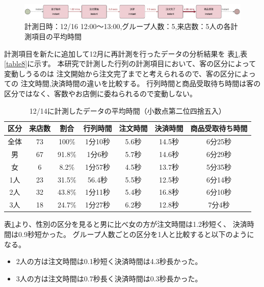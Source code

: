 \documentclass{jsarticle}
\begin{document}
\begin{figure}[H]
  \centering
  \includegraphics[width=15cm]{5-5b.png}
  \caption{計測日時：12/16 12:00〜13:00,グループ人数：5,来店数：5人の各計測項目の平均時間}
  \label{fig:5-5b}
\end{figure}





計測項目を新たに追加して12月に再計測を行ったデータの分析結果を
表\ref{table7},表\ref{table8}に示す。
本研究で計測した行列の計測項目において、客の区分によって変動しうるのは
注文開始から注文完了までと考えられるので、客の区分によっての
注文時間,決済時間の違いを比較する。
行列時間と商品受取待ち時間は客の区分ではなく、客数やお店側に委ねられるので変動しない。

\begin{table}[H]
 \begin{center}
  \caption{12/14に計測したデータの平均時間（小数点第二位四捨五入）}
    \begin{tabular}{|c|c|c|c|c|c|c|} \hline
区分 & 来店数 & 割合 & 行列時間 & 注文時間 & 決済時間 & 商品受取待ち時間 \\ \hline\hline
全体  & 73 & 100\%  & 1分10秒 & 5.6秒 & 14.5秒 & 6分25秒 \\ \hline \hline
男    & 67 & 91.8\% & 1分6秒  & 5.7秒 & 14.6秒 & 6分29秒 \\ \hline
女    & 6  & 8.2\%  & 1分57秒 & 4.5秒 & 13.7秒 & 5分35秒  \\ \hline \hline
1人   & 23 & 31.5\% & 56.4秒  & 5.5秒 & 12.5秒 & 6分14秒 \\ \hline
2人   & 32 & 43.8\% & 1分11秒 & 5.4秒 & 16.8秒 & 6分10秒 \\ \hline
3人   & 18 & 24.7\% & 1分27秒 & 6.2秒 & 12.8秒 & 7分4秒  \\ \hline
 \end{tabular}
 \label{table7}
 \end{center}
\end{table}

表\ref{table7}より、性別の区分を見ると男に比べ女の方が注文時間は1.2秒短く、
決済時間は0.9秒短かった。
グループ人数ごとの区分を1人と比較すると以下のようになる。
\begin{itemize}
\item 2人の方は注文時間は0.1秒短く決済時間は4.3秒長かった。
\item 3人の方は注文時間は0.7秒長く決済時間は0.3秒長かった。
\end{itemize}
\end{document}
